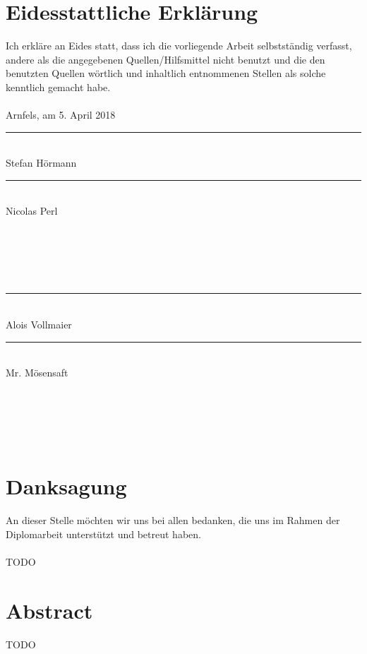 \frontmatter												%
\addtocounter{page}{2}

\newcommand{\doublesignature}[2]{%
  \parbox{\textwidth}{
    \hfill
    \parbox{7cm}{
      \centering
      \rule{6cm}{1pt}\\
      #1
    }
    \parbox{7cm}{
      \centering
      \rule{6cm}{1pt}\\
      #2
    }
  }
  \mbox{}\\
  \mbox{}\\
  \mbox{}\\
  \mbox{}\\
}

\vspace*{20pt}

\section*{Eidesstattliche Erklärung}
\label{sec:eidesstattliche-erklaerung}
Ich erkläre an Eides statt, dass ich die vorliegende Arbeit selbstständig verfasst, andere als die angegebenen
Quellen/Hilfsmittel nicht benutzt und die den benutzten Quellen wörtlich und inhaltlich entnommenen
Stellen als solche kenntlich gemacht habe.\\
\\
Arnfels, am 5. April 2018\\

\vskip 1cm

\doublesignature{Stefan Hörmann}{Nicolas Perl}
\doublesignature{Alois Vollmaier}{Mr. Mösensaft}

\vskip 5cm

\clearpage

\newpage
\thispagestyle{empty}
\mbox{}

\clearpage

\section*{Danksagung}
\label{sec:danksagung}
An dieser Stelle möchten wir uns bei allen bedanken, die uns im Rahmen der Diplomarbeit unterstützt und betreut haben.\\
\\
TODO

\clearpage

\newpage
\thispagestyle{empty}
\mbox{}

\clearpage

\section*{Abstract}
\label{sec:abstract}
TODO

